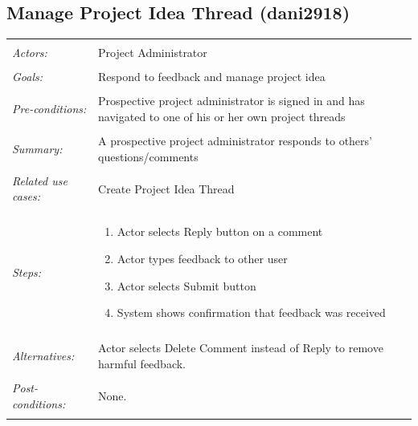 \documentclass[11pt]{report}
\begin{document}
\subsection{Manage Project Idea Thread (dani2918)}
\begin{tabular}{ p{2cm} p{12cm} }
 \hline
 \\
 \textit{Actors:} & Project Administrator \\ 
 \\
 \textit{Goals:} & Respond to feedback and manage project idea  \\
 \\
 \textit{Pre-conditions:} & Prospective project administrator is signed in and has navigated to one of his or her own project threads  \\
 \\
 \textit{Summary:} &  A prospective project administrator responds to others' questions/comments \\ 
 \\
 \textit{Related use cases:} & Create Project Idea Thread \\ 
 \\
 \textit{Steps:} & \begin{enumerate}
  \item Actor selects Reply button on a comment
  \item Actor types feedback to other user
  \item Actor selects Submit button 
  \item System shows confirmation that feedback was received 
  
 \end{enumerate} \\
 \\
 \textit{Alternatives:} & Actor selects Delete Comment instead of Reply to remove harmful feedback. \\
 \\
 \textit{Post-conditions:} & None. \\
 \\
\hline
\end{tabular}
\end{document}
